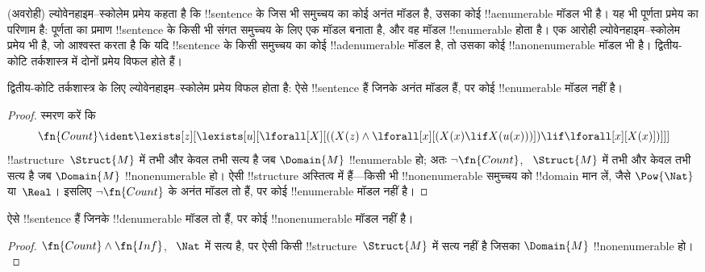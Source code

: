 \documentclass[../../../include/open-logic-section]{subfiles}
\begin{document}


\begin{explain}
(अवरोही) ल्योवेनहाइम--स्कोलेम प्रमेय कहता है कि !!{sentence} के जिस भी
समुच्चय का कोई अनंत मॉडल है, उसका कोई !!a{enumerable} मॉडल भी है। यह भी
पूर्णता प्रमेय का परिणाम है: पूर्णता का प्रमाण !!{sentence} के किसी भी
संगत समुच्चय के लिए एक मॉडल बनाता है, और वह मॉडल !!{enumerable} होता है।
एक आरोही ल्योवेनहाइम--स्कोलेम प्रमेय भी है, जो आश्वस्त करता है कि यदि
!!{sentence} के किसी समुच्चय का कोई !!a{denumerable} मॉडल है, तो उसका कोई
!!a{nonenumerable} मॉडल भी है। द्वितीय-कोटि तर्कशास्त्र में दोनों प्रमेय
विफल होते हैं।
\end{explain}


\begin{thm}
 द्वितीय-कोटि तर्कशास्त्र के लिए
ल्योवेनहाइम--स्कोलेम प्रमेय विफल होता है: ऐसे !!{sentence} हैं जिनके अनंत
मॉडल हैं, पर कोई !!{enumerable} मॉडल नहीं है।
\end{thm}

\begin{proof}
स्मरण करें कि
\[
\fn{Count} \ident \lexists[z][\lexists[u][\lforall[X][((X(z) \land
      \lforall[x][(X(x) \lif X(u(x)))]) \lif \lforall[x][X(x)])]]]
\]
!!a{structure}~$\Struct{M}$ में तभी और केवल तभी सत्य है जब $\Domain{M}$
!!{enumerable} हो; अतः $\lnot\fn{Count}$, ~$\Struct{M}$ में तभी और केवल
तभी सत्य है जब $\Domain{M}$ !!{nonenumerable} हो। ऐसी !!{structure}
अस्तित्व में हैं---किसी भी !!{nonenumerable} समुच्चय को !!{domain} मान लें,
जैसे $\Pow{\Nat}$ या~$\Real$। इसलिए $\lnot \fn{Count}$ के अनंत मॉडल तो
हैं, पर कोई !!{enumerable} मॉडल नहीं है।
\end{proof}

\begin{thm}
ऐसे !!{sentence} हैं जिनके !!{denumerable} मॉडल तो हैं, पर कोई
!!{nonenumerable} मॉडल नहीं है।
\end{thm}

\begin{proof}
$\fn{Count} \land \fn{Inf}$, ~$\Nat$ में सत्य है, पर ऐसी किसी
!!{structure}~$\Struct{M}$ में सत्य नहीं है जिसका $\Domain{M}$
!!{nonenumerable} हो।
\end{proof}
\end{document}
